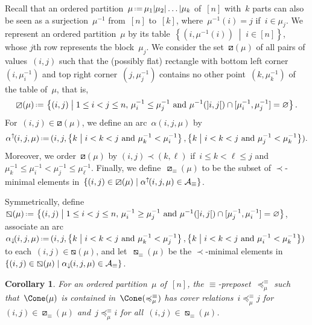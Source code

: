 \documentclass{amsart}
\newtheorem{corollary}[theorem]{Corollary}
\newtheorem{proposition}[theorem]{Proposition}
\theoremstyle{definition}
\newcommand{\set}[2]{\left\{ #1 \;\middle|\; #2 \right\}} %
\newcommand{\eqdef}{\mbox{\,\raisebox{0.2ex}{\scriptsize\ensuremath{\mathrm:}}\ensuremath{=}\,}} %
\newcommand{\arcs}{{\mathcal{A}}} %
\newcommand{\arcDown}{\smash{\alpha_{\downarrow\!}}} %
\newcommand{\arcUp}{\smash{\alpha^{\uparrow\!}}} %
\begin{document}
Recall that an ordered partition~$\mu \eqdef \mu_1 | \mu_2 | \dots | \mu_k$ of~$[n]$ with~$k$ parts can also be seen as a surjection~$\mu^{-1}$ from~$[n]$ to~$[k]$, where~$\mu^{-1}(i) = j$ if~$i \in \mu_j$.
We represent an ordered partition~$\mu$ by its table~$\set{(i, \mu^{-1}(i))}{i \in [n]}$, whose $j$th row represents the block~$\mu_j$.
We consider the set~$\boxslash(\mu)$ of all pairs of values~$(i,j)$ such that the (possibly flat) rectangle with bottom left corner~$(i, \mu^{-1}_i)$ and top right corner~$(j, \mu^{-1}_j)$ contains no other point~$(k, \mu^{-1}_k)$ of the  table of~$\mu$, that is,
\[
\boxslash(\mu) \eqdef \set{(i, j)}{1 \le i < j \le n, \, \mu^{-1}_i \le \mu^{-1}_j \text{ and } \mu^{-1}(]i, j[) \cap {[\mu^{-1}_i, \mu^{-1}_j]} = \varnothing}.
\]
For~$(i, j) \in \boxslash(\mu)$, we define an arc~$\alpha(i, j, \mu)$ by
\[
\arcUp(i, j, \mu) \eqdef (i, j, \set{k}{i < k < j \text{ and } \mu^{-1}_k < \mu^{-1}_i}, \set{k}{i < k < j \text{ and } \mu^{-1}_j < \mu^{-1}_k}).
\]
Moreover, we order~$\boxslash(\mu)$ by $(i, j) \prec (k,\ell)$ if~$i \le k < \ell \le j$ and~$\mu^{-1}_k \le \mu^{-1}_i < \mu^{-1}_j \le \mu^{-1}_\ell$.
Finally, we define~$\boxslash_\equiv(\mu)$ to be the subset of $\prec$-minimal elements in~$\set{(i, j) \in \boxslash(\mu)}{\arcUp(i, j, \mu) \in \arcs_\equiv}$.

Symmetrically, define~$\boxbslash(\mu) \eqdef \set{(i, j)}{1 \le i < j \le n, \, \mu^{-1}_i \ge \mu^{-1}_j \text{ and } \mu^{-1}({]i,j[}) \cap {[\mu^{-1}_j, \mu^{-1}_i]} = \varnothing}$, associate an arc~$\arcDown(i, j, \mu) \eqdef (i, j, \set{k}{i < k < j \text{ and } \mu^{-1}_k < \mu^{-1}_j}, \set{k}{i < k < j \text{ and } \mu^{-1}_i < \mu^{-1}_k})$ to each~${(i,j) \in \boxbslash(\mu)}$, and let~$\boxbslash_\equiv(\mu)$ be the $\prec$-minimal elements in~$\set{(i, j) \in \boxbslash(\mu)}{\arcDown(i, j, \mu) \in \arcs_\equiv}$.


\begin{corollary}
\label{coro:insertionMapFaces}
For an ordered partition~$\mu$ of~$[n]$, the $\equiv$-preposet~$\preccurlyeq^\equiv_\mu$ such that~$\Cone(\mu)$ is contained in~$\Cone(\preccurlyeq^\equiv_\mu)$ has cover relations~$i \preccurlyeq^\equiv_\mu j$ for~$(i,j) \in \boxslash_\equiv(\mu)$ and~$j \preccurlyeq^\equiv_\mu i$ for all~$(i,j) \in \boxbslash_\equiv(\mu)$.
\end{corollary}
\end{document}
